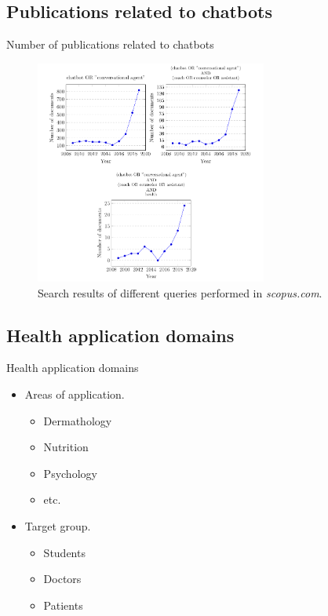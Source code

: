 \documentclass{beamer}
\begin{document}
\subsection{Publications related to chatbots}
\begin{frame}[fragile]{Number of publications related to chatbots}
  \begin{figure}
    \includegraphics[width=0.68\textwidth]{publications.png}
    \caption{Search results of different queries performed in \textit{scopus.com}.}
  \end{figure}
\end{frame}
\subsection{Health application domains}
\begin{frame}[fragile]{Health application domains}
  \begin{itemize}[<+->]
    \item Areas of application.
    \begin{itemize}[<+->]
      \item Dermathology
      \item Nutrition
      \item Psychology
      \item etc.
    \end{itemize}
    \item Target group.
    \begin{itemize}[<+->]
      \item Students
      \item Doctors
      \item Patients
    \end{itemize}
  \end{itemize}
\end{frame}
\end{document}
